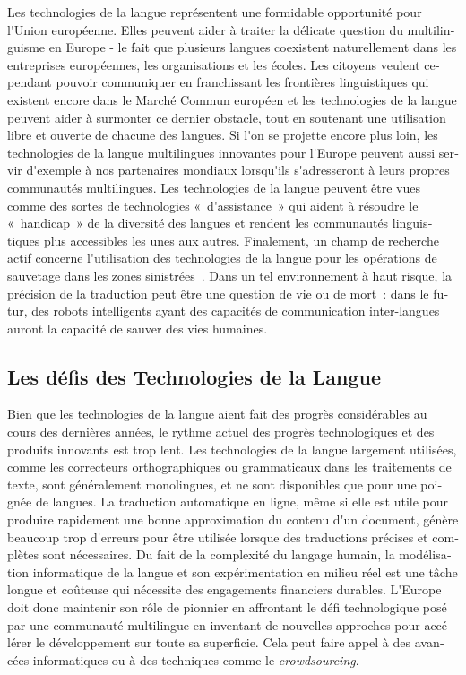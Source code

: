 \begin{french}
\begin{multicols}{2}
Les technologies de la langue représentent une formidable opportunité
pour l{\mbox '}Union européenne. Elles peuvent aider à traiter la
délicate question du multilinguisme en Europe - le fait que plusieurs
langues coexistent naturellement dans les entreprises européennes, les
organisations et les écoles. Les citoyens veulent cependant pouvoir
communiquer en franchissant les frontières linguistiques qui existent
encore dans le Marché Commun européen et les technologies de la langue
peuvent aider à surmonter ce dernier obstacle, tout en soutenant une
utilisation libre et ouverte de chacune des langues. Si l{\mbox '}on
se projette encore plus loin, les technologies de la langue
multilingues innovantes pour l{\mbox '}Europe peuvent aussi servir
d{\mbox '}exemple à nos partenaires mondiaux lorsqu{\mbox '}ils
s{\mbox '}adresseront à leurs propres communautés multilingues. Les
technologies de la langue peuvent être vues comme des sortes de
technologies «~d{\mbox '}assistance~» qui aident à résoudre le
«~handicap~» de la diversité des langues et rendent les communautés
linguistiques plus accessibles les unes aux autres. Finalement, un
champ de recherche actif concerne l{\mbox '}utilisation des
technologies de la langue pour les opérations de sauvetage dans les
zones sinistrées~\cite{resnick2011}. Dans un tel environnement à haut
risque, la précision de la traduction peut être une question de vie ou
de mort~: dans le futur, des robots intelligents ayant des capacités
de communication inter-langues auront la capacité de sauver des vies
humaines.

\subsection{Les défis des Technologies de la Langue}

Bien que les technologies de la langue aient fait des progrès
considérables au cours des dernières années, le rythme actuel des
progrès technologiques et des produits innovants est trop lent. Les
technologies de la langue largement utilisées, comme les correcteurs
orthographiques ou grammaticaux dans les traitements de texte, sont
généralement monolingues, et ne sont disponibles que pour une poignée
de langues. La traduction automatique en ligne, même si elle est utile
pour produire rapidement une bonne approximation du contenu d{\mbox
 '}un document, génère beaucoup trop d{\mbox '}erreurs pour être
utilisée lorsque des traductions précises et complètes sont
nécessaires. Du fait de la complexité du langage humain, la
modélisation informatique de la langue et son expérimentation en
milieu réel est une tâche longue et coûteuse qui nécessite des
engagements financiers durables. L{\mbox '}Europe doit donc maintenir
son rôle de pionnier en affrontant le défi technologique posé par une
communauté multilingue en inventant de nouvelles approches pour
accélérer le développement sur toute sa superficie. Cela peut faire
appel à des avancées informatiques ou à des techniques comme le {\it
  crowdsourcing}.


\end{multicols}
\end{french}
